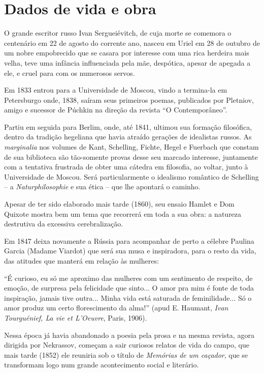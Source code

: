 \section{Dados de vida e obra}

O grande escritor russo Ivan Sergueiévitch, de cuja morte se comemora o
centenário em 22 de agosto do corrente ano, nasceu em Uriel em 28 de
outubro de um nobre empobrecido que se casara por interesse com uma rica
herdeira mais velha, teve uma infância influenciada pela mãe, despótica,
apesar de apegada a ele, e cruel para com os numerosos servos.

Em 1833 entrou para a Universidade de Moscou, vindo a termina-la em
Petersburgo onde, 1838, saíram seus primeiros poemas, publicados por
Pletniov, amigo e sucessor de Púchkin na direção da revista ``O
Contemporâneo''.

Partiu em seguida para Berlim, onde, até 1841, ultimou sua formação
filosófica, dentro da tradição hegeliana que havia atraído gerações de
idealistas russos. As \emph{marginalia} nos volumes de Kant, Schelling,
Fichte, Hegel e Fuerbach que constam de sua biblioteca são tão-somente
provas desse seu marcado interesse, juntamente com a tentativa frustrada
de obter uma cátedra em filosofia, ao voltar, junto à Universidade de
Moscou. Será particularmente o idealismo romântico de Schelling -- a
\emph{Naturphilosophie} e sua ética -- que lhe apontará o caminho.

Apesar de ter sido elaborado mais tarde (1860), seu ensaio Hamlet e Dom
Quixote mostra bem um tema que recorrerá em toda a sua obra: a natureza
destrutiva da excessiva cerebralização.

Em 1847 deixa novamente a Rússia para acompanhar de perto a célebre
Paulina Garcia (Madame Viardot) que será sua musa e inspiradora, para o
resto da vida, das atitudes que manterá em relação às mulheres:

``É curioso, eu só me aproximo das mulheres com um sentimento de
respeito, de emoção, de surpresa pela felicidade que sinto... O amor pra
mim é fonte de toda inspiração, jamais tive outra... Minha vida está
saturada de feminilidade... Só o amor produz um certo florescimento da
alma!'' (apud E. Haumant, \emph{Ivan Tourguénief, La vie et L'Oeuvre},
Paris, 1906).

Nessa época já havia abandonado a poesia pela prosa e na mesma revista,
agora dirigida por Nekrassov, começam a sair curiosos relatos de vida do
campo, que mais tarde (1852) ele reuniria sob o título de \emph{Memórias
de um caçador}, que se transformam logo num grande acontecimento social
e literário.

